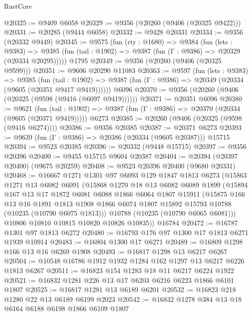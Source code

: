 \begin{lexlean}{RustCore}
\begin{coremodule}
@20325 := @9409 @6058
@20329 := @9356 (@20260 (@9406 (@20325 @9422)))
@20331 := @20285 (@9444 @6058)
@20332 := @9428 @20331
@20334 := @9356 (@20332 @9449)
@20345 := @9575
    (fun (rty : @1680) =>
    @9384
      (fun (lets : @9383) =>
      @9385 (fun (tail : @1902) => @9387 (fun (Γ : @9386) => @20329 (@20334 @20295)))))
    @1795
@20349 := @9356 (@20260 (@9406 (@20325 @9599)))
@20351 := @9606 @20290 @11083
@20363 := @9597
    (fun (lets : @9383) =>
    @9385
      (fun (tail : @1902) =>
      @9387 (fun (Γ : @9386) => @20349 (@20334 (@9605 (@20351 @9417 @9419))))))
    @6096
@20370 := @9356 (@20260 (@9406 (@20325 (@9598 (@9416 (@6097 @9419))))))
@20371 := @20351 @6096
@20380 := @9621
    (fun (tail : @1902) => @9387 (fun (Γ : @9386) => @20370 (@20334 (@9605 (@20371 @9419)))))
    @6273
@20385 := @20260 (@9406 (@20325 (@9598 (@9416 @6274))))
@20386 := @9356 @20385
@20387 := @20371 @6273
@20393 := @9639 (fun (Γ : @9386) => @20386 (@20334 (@9605 @20387))) @15715
@20394 := @9523 @20385
@20396 := @20332 (@9448 @15715)
@20397 := @9356 @20396
@20400 := @9455 @15715 @9604 @20387
@20404 := @20394 (@20397 @20400) (@9675 @20259)
@20408 := @9523 @20396 @20400 (@9680 @20331)
@20468 := @16667
    @1271
    @1301
    @97
    @6093
    @129
    @1847
    @1813
    @6273
    (@15863
      @1271
      @13
      @6082
      @6091
      (@15868
        @1270
        @18
        @13
        @6082
        @6089
        @1899
        (@15894
          @167
          @13
          @17
          @1872
          @6081
          @6088
          @1866
          @6064
          @1807
          @15911
          (@15875
            @166
            @13
            @16
            @1891
            @1813
            @1908
            @1866
            @6074
            @1807
            @15892
            @15793
            @10788
            (@10235 (@10790 @6075 @1813)))
          @10788
          (@10235 (@10790 @6065 @6081)))
        @10806
        @10810
        @10815
        @10820
        @10826
        @10835))
    @16784
@20472 := @16787 @1301 @97 @1813 @6272
@20480 := @16793 @176 @97 @1300 @17 @1813 @6271 @1939 @10914
@20483 := @16804 @1300 @17 @6271
@20489 := @16809 @1298 @166 @13 @16 @6269 @1908
@20493 := @16817 @1298 @13 @6217 @6267
@20504 := @10548 @16786 @1912 @1932 @1284 @162 @1297 @13 @6217 @6226 @1813 @6267
@20511 := @16823 @154 @1283 @18 @11 @6217 @6224 @1922
@20521 := @16832 @1281 @226 @13 @17 @6203 @6216 @6223 @1866 @6101 @1807
@20525 := @16817 @1281 @13 @6189 @6201
@20532 := @16823 @218 @1280 @22 @13 @6189 @6199 @2023
@20542 := @16832 @1278 @384 @13 @18 @6164 @6188 @6198 @1866 @6109 @1807

\end{coremodule}
\end{lexlean}

